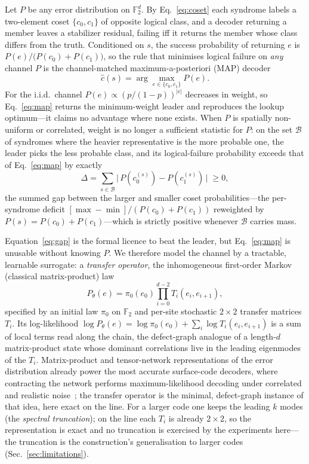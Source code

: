 \documentclass[reprint,aps,prxquantum,amsmath,amssymb,floatfix,nofootinbib,longbibliography]{revtex4-2}
\theoremstyle{definition}
\theoremstyle{remark}
\theoremstyle{plain}
\newcommand{\F}{\mathbb{F}}
\newcommand{\abs}[1]{\left\lvert #1 \right\rvert}
\begin{document}
Let $P$ be any error distribution on $\F_2^d$. By Eq.~\eqref{eq:coset} each syndrome labels a two-element coset $\{c_0,c_1\}$ of opposite logical class, and a decoder returning a member leaves a stabilizer residual, failing iff it returns the member whose class differs from the truth. Conditioned on $s$, the success probability of returning $e$ is $P(e)/\bigl(P(c_0)+P(c_1)\bigr)$, so the rule that minimises logical failure on \emph{any} channel $P$ is the channel-matched maximum-a-posteriori (MAP) decoder
\begin{equation}
  \hat c(s)=\arg\max_{e\in\{c_0,c_1\}}P(e).
  \label{eq:map}
\end{equation}
For the i.i.d.\ channel $P(e)\propto(p/(1-p))^{\abs e}$ decreases in weight, so Eq.~\eqref{eq:map} returns the minimum-weight leader and reproduces the lookup optimum---it claims no advantage where none exists. When $P$ is spatially non-uniform or correlated, weight is no longer a sufficient statistic for $P$: on the set $\mathcal B$ of syndromes where the heavier representative is the more probable one, the leader picks the less probable class, and its logical-failure probability exceeds that of Eq.~\eqref{eq:map} by exactly
\begin{equation}
  \Delta=\sum_{s\in\mathcal B}\bigl|\,P(c_0^{(s)})-P(c_1^{(s)})\,\bigr|\;\ge 0,
  \label{eq:gap}
\end{equation}
the summed gap between the larger and smaller coset probabilities---the per-syndrome deficit $[\max-\min]/(P(c_0)+P(c_1))$ reweighted by $P(s)=P(c_0)+P(c_1)$---which is strictly positive whenever $\mathcal B$ carries mass.

Equation~\eqref{eq:gap} is the formal licence to beat the leader, but Eq.~\eqref{eq:map} is unusable without knowing $P$. We therefore model the channel by a tractable, learnable surrogate: a \emph{transfer operator}, the inhomogeneous first-order Markov (classical matrix-product) law
\begin{equation}
  P_\theta(e)=\pi_0(e_0)\prod_{i=0}^{d-2}T_i(e_i,e_{i+1}),
  \label{eq:transfer}
\end{equation}
specified by an initial law $\pi_0$ on $\F_2$ and per-site stochastic $2\times2$ transfer matrices $T_i$. Its log-likelihood $\log P_\theta(e)=\log\pi_0(e_0)+\sum_i\log T_i(e_i,e_{i+1})$ is a sum of local terms read along the chain, the defect-graph analogue of a length-$d$ matrix-product state whose dominant correlations live in the leading eigenmodes of the $T_i$. Matrix-product and tensor-network representations of the error distribution already power the most accurate surface-code decoders, where contracting the network performs maximum-likelihood decoding under correlated and realistic noise~\cite{bravyi2014efficient,darmawan2017tensor,chubb2021general}; the transfer operator is the minimal, defect-graph instance of that idea, here exact on the line. For a larger code one keeps the leading $k$ modes (the \emph{spectral truncation}); on the line each $T_i$ is already $2\times2$, so the representation is exact and no truncation is exercised by the experiments here---the truncation is the construction's generalisation to larger codes (Sec.~\ref{sec:limitations}).
\end{document}
